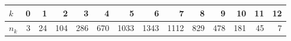  \begin{center}
 \setlength{\tabcolsep}{3pt}
 \begin{tabular}{l|rrrrrrrrrrrrr}
  \hline
  $k$ & 0 & 1 & 2 & 3 & 4 & 5 & 6 & 7 & 8 & 9 & 10 & 11 & 12 \\ 
  \hline
  $n_k$ & 3 & 24 & 104 & 286 & 670 & 1033 & 1343 & 1112 & 829 & 478 & 181 & 45 & 7 \\ 
  \hline
 \end{tabular}
 \end{center}
